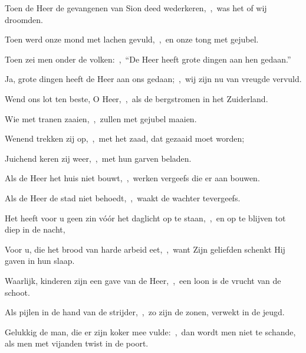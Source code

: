 \documentclass[12pt,twoside,a5paper]{article}
\begin{document}


\begin{halfparskip}
  Toen de Heer de gevangenen van Sion deed wederkeren,~\sep\ was het of wij droomden.


  Toen werd onze mond met lachen gevuld,~\sep\ en onze tong met gejubel.

  Toen zei men onder de volken:~\sep\ ``De Heer heeft grote dingen aan hen gedaan.''

  Ja, grote dingen heeft de Heer aan ons gedaan;~\sep\ wij zijn nu van vreugde vervuld.

  Wend ons lot ten beste, O Heer,~\sep\ als de bergstromen in het Zuiderland.

  Wie met tranen zaaien,~\sep\ zullen met gejubel maaien.

  Wenend trekken zij op,~\sep\ met het zaad, dat gezaaid moet worden;

  Juichend keren zij weer,~\sep\ met hun garven beladen.
\end{halfparskip}


\begin{halfparskip}
  Als de Heer het huis niet bouwt,~\sep\ werken vergeefs die er aan bouwen.


  Als de Heer de stad niet behoedt,~\sep\ waakt de wachter tevergeefs.

  Het heeft voor u geen zin vóór het daglicht op te staan,~\sep\ en op te blijven tot diep in de nacht,

  Voor u, die het brood van harde arbeid eet,~\sep\ want Zijn geliefden schenkt Hij gaven in hun slaap.

  Waarlijk, kinderen zijn een gave van de Heer,~\sep\ een loon is de vrucht van de schoot.

  Als pijlen in de hand van de strijder,~\sep\ zo zijn de zonen, verwekt in de jeugd.

  Gelukkig de man, die er zijn koker mee vulde:~\sep\ dan wordt men niet te schande, als men met vijanden twist in de poort.
\end{halfparskip}
\end{document}
